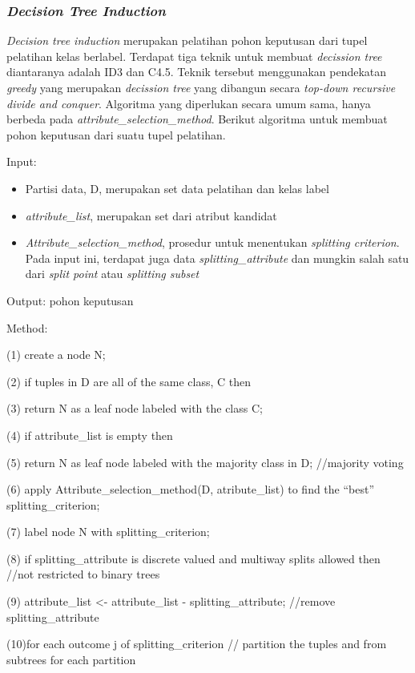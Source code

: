 \subsubsection{\textsl{Decision Tree Induction}}
\textsl{Decision tree induction} merupakan pelatihan pohon keputusan dari tupel pelatihan kelas berlabel. Terdapat tiga teknik untuk membuat \textsl{decission tree} diantaranya adalah ID3 dan C4.5. Teknik tersebut menggunakan pendekatan \textsl{greedy} yang merupakan \textsl{decission tree} yang dibangun secara \textsl{top-down recursive divide and conquer}. Algoritma yang diperlukan secara umum sama, hanya berbeda pada \textsl{attribute\_selection\_method}. Berikut algoritma untuk membuat pohon keputusan dari suatu tupel pelatihan.

Input:
\begin{itemize}
	\item Partisi data, D, merupakan set data pelatihan dan kelas label
	\item \textsl{attribute\_list}, merupakan set dari atribut kandidat
	\item \textsl{Attribute\_selection\_method}, prosedur untuk menentukan \textsl{splitting criterion}. Pada input ini, terdapat juga data \textsl{splitting\_attribute} dan mungkin salah satu dari \textsl{split point} atau \textsl{splitting subset}
\end{itemize}

Output: pohon keputusan

Method:

(1) create a node N;

(2) if tuples in D are all of the same class, C then

(3)	return N as a leaf node labeled with the class C;

(4)	if attribute\_list is empty then

(5) return N as leaf node labeled with the majority class in D; //majority voting

(6)	apply Attribute\_selection\_method(D, atribute\_list) to find the "`best"' splitting\_criterion;

(7) label node N with splitting\_criterion;

(8) if splitting\_attribute is discrete valued and
				multiway splits allowed then //not restricted to binary trees

(9) attribute\_list <- attribute\_list - splitting\_attribute; //remove splitting\_attribute

(10)for each outcome j of splitting\_criterion // partition the tuples and from subtrees for each partition

